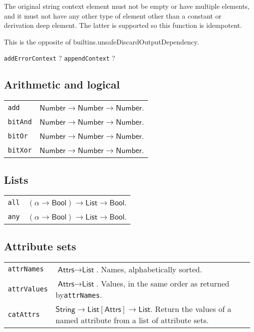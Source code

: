 \documentclass[10pt, a4paper, landscape]{article}
\newcommand{\cmd}[1]{\texttt{#1}}
\newcommand{\str}{\textsf{String}}
\newcommand{\num}{\textsf{Number}}
\newcommand{\lst}{\textsf{List}}
\newcommand{\ats}{\textsf{Attrs}}
\newcommand{\bln}{\textsf{Bool}}
\begin{document}
\begin{multicols*}{3}
    The original string context element must not be empty or have multiple elements, and it must not have any other type of element other than a constant or derivation deep element. The latter is supported so this function is idempotent.

    This is the opposite of builtins.unsafeDiscardOutputDependency.
  
\cmd{addErrorContext} ?
\cmd{appendContext} ?


\subsection*{Arithmetic and logical}
\begin{tabularx}{\columnwidth}{@{}l>{\raggedright\arraybackslash}X@{}}
  \cmd{add} &  $\num \to \num \to \num$. \\
  \cmd{bitAnd} & $\num \to \num \to \num$. \\
  \cmd{bitOr} & $\num \to \num \to \num$. \\
  \cmd{bitXor} & $\num \to \num \to \num$. \\
  
\end{tabularx}

\subsection*{Lists}
\begin{tabularx}{\columnwidth}{@{}l>{\raggedright\arraybackslash}X@{}}
\cmd{all} & $(\alpha \to \bln) \to \lst \to \bln$. \\
\cmd{any} & $(\alpha \to \bln) \to \lst \to \bln$. \\ 
\end{tabularx}

\subsection*{Attribute sets}
\begin{tabularx}{\columnwidth}{@{}l>{\raggedright\arraybackslash}X@{}}
\cmd{attrNames} & $\ats \to \lst$. Names, alphabetically
sorted. \\
\cmd{attrValues} & $\ats \to \lst$. Values, in the same order as returned
by\cmd{attrNames}. \\
\cmd{catAttrs} & $\str \to \lst[\ats] \to \lst$. Return the values of a
named attribute from a list of attribute sets.


\end{tabularx}
\end{multicols*}
\end{document}
